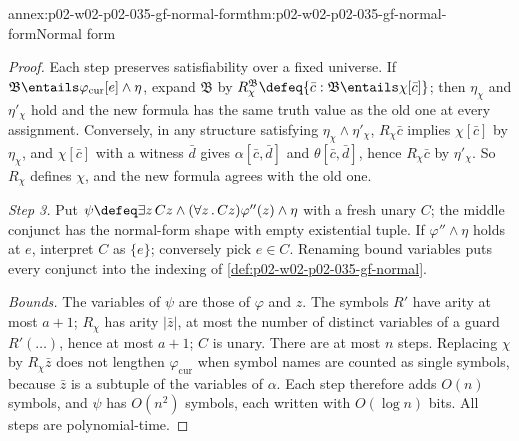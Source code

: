 \begin{annexitem}{annex:p02-w02-p02-035-gf-normal-form}{thm:p02-w02-p02-035-gf-normal-form}{Normal form}
\begin{proof}
Each step preserves satisfiability over a fixed universe.  If
\(\mathfrak B\entails\varphi_{\mathrm{cur}}[e]\land\eta\), expand
\(\mathfrak B\) by \(R_\chi^{\mathfrak B}\defeq\{\bar c:\mathfrak B\entails\chi[\bar c]\}\);
then \(\eta_\chi\) and \(\eta'_\chi\) hold and the new formula has the same
truth value as the old one at every assignment.  Conversely, in any
structure satisfying \(\eta_\chi\land\eta'_\chi\), \(R_\chi\bar c\) implies
\(\chi[\bar c]\) by \(\eta_\chi\), and \(\chi[\bar c]\) with a witness
\(\bar d\) gives \(\alpha[\bar c,\bar d]\) and \(\theta[\bar c,\bar d]\),
hence \(R_\chi\bar c\) by \(\eta'_\chi\).  So \(R_\chi\) defines \(\chi\),
and the new formula agrees with the old one.

\emph{Step 3.}  Put \(\psi\defeq\exists z\,Cz\land(\forall z\,.\,Cz)\varphi''(z)\land\eta\)
with a fresh unary \(C\); the middle conjunct has the normal-form shape with
empty existential tuple.  If \(\varphi''\land\eta\) holds at \(e\), interpret
\(C\) as \(\{e\}\); conversely pick \(e\in C\).  Renaming bound variables
puts every conjunct into the indexing of
\cref{def:p02-w02-p02-035-gf-normal}.

\emph{Bounds.}  The variables of \(\psi\) are those of \(\varphi\) and \(z\).
The symbols \(R'\) have arity at most \(a+1\); \(R_\chi\) has arity
\(\lvert\bar z\rvert\), at most the number of distinct variables of a guard
\(R'(\ldots)\), hence at most \(a+1\); \(C\) is unary.  There are at most
\(n\) steps.  Replacing \(\chi\) by \(R_\chi\bar z\) does not lengthen
\(\varphi_{\mathrm{cur}}\) when symbol names are counted as single symbols,
because \(\bar z\) is a subtuple of the variables of \(\alpha\).  Each step
therefore adds \(O(n)\) symbols, and \(\psi\) has \(O(n^2)\) symbols, each
written with \(O(\log n)\) bits.  All steps are polynomial-time.
\end{proof}
\end{annexitem}


